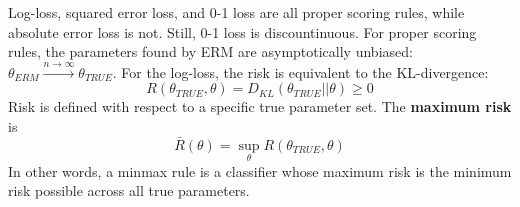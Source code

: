 Log-loss, squared error loss, and 0-1 loss are all proper scoring rules, while absolute error loss is not. Still, 0-1 loss is discountinuous. For proper scoring rules, the parameters found by ERM are asymptotically unbiased: $\theta_{ERM} \xrightarrow{n \to \infty} \theta_{\textit{TRUE}}$. For the log-loss, the risk is equivalent to the KL-divergence:
\begin{equation*}
    R(\theta_{\textit{TRUE}}, \theta) = D_{KL}(\theta_{\textit{TRUE}} || \theta) \geq 0
\end{equation*}
Risk is defined with respect to a specific true parameter set. The \textbf{maximum risk} is
\begin{equation*}
    \bar{R}(\theta) = \sup_{\theta} R(\theta_{\textit{TRUE}}, \theta)
\end{equation*}
In other words, a minmax rule is a classifier whose maximum risk is the minimum risk possible across all true parameters.

